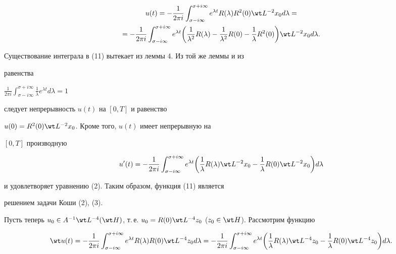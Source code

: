 \begin{multline} 


u(t)= 


-\frac{1}{2\pi i}\int^{\sigma+i\infty}_{\sigma-i\infty}e^{\lambda t} 


R(\lambda)R^2(0)\wt L{}^{-2}x_0d\lambda= \\ =


-\frac{1}{2\pi i}\int^{\sigma+i\infty}_{\sigma-i\infty}e^{\lambda t} 


\bigg(\frac{1}{\lambda^2}R(\lambda)-\frac{1}{\lambda^2}R(0)- 


\frac{1}{\lambda}R^2(0)\bigg)\wt L{}^{-2}x_0d\lambda. 


\end{multline} 


Существование интеграла в (11) вытекает из леммы 4. Из той же леммы и из 


равенства 


$\frac{1}{2\pi i}\int^{\sigma+i\infty}_{\sigma-i\infty} \frac{1}{\lambda} 


e^{\lambda t}d\lambda=1$ 


следует непрерывность $u(t)$ на $[0,T]$ и равенство 


$u(0)=R^2(0)\wt L{}^{-2}x_0$. Кроме того, $u(t)$ имеет непрерывную на 


$[0,T]$ производную 


$$ 


u'(t)= 


-\frac{1}{2\pi i}\int^{\sigma+i\infty}_{\sigma-i\infty}e^{\lambda t} 


\bigg(\frac{1}{\lambda}R(\lambda)\wt L{}^{-2}x_0 


-\frac{1}{\lambda}R(0)\wt L{}^{-2}x_0\bigg)d\lambda 


$$ 


и удовлетворяет уравнению (2). Таким образом, функция (11) является 


решением задачи Коши (2), (3). 


 


Пусть теперь $u_0\in A^{-1}\wt L{}^{-4}(\wt H)$, т.\,е. $u_0=R(0)\wt 


L{}^{-4}z_0$ ($z_0\in \wt H$). Рассмотрим функцию 


\begin{equation} 


\wt u(t)= 


-\frac{1}{2\pi i}\int^{\sigma+i\infty}_{\sigma-i\infty}e^{\lambda t} 


R(\lambda)R(0)\wt L{}^{-4}z_0d\lambda= 


-\frac{1}{2\pi i}\int^{\sigma+i\infty}_{\sigma-i\infty}e^{\lambda t} 


\bigg(\frac{1}{\lambda}R(\lambda)\wt L{}^{-4}z_0- 


\frac{1}{\lambda}R(0)\wt L{}^{-4}z_0\bigg)d\lambda. 


\end{equation} 


